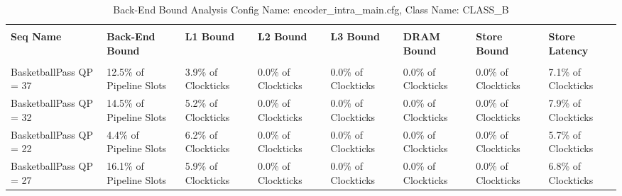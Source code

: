 \documentclass{article}%
\begin{document}
\begin{longtabu}{| X[l] | X[l] | X[l] | X[l] | X[l] | X[l] | X[l] | X[l] |}%
\caption{%
Back{-}End Bound Analysis\newline%
 Config Name: encoder\_intra\_main.cfg,\newline%
 Class Name: CLASS\_B\newline%
%
}%
\hline%
&&&&&&&\\%
\textbf{Seq Name}&\textbf{Back{-}End Bound}&\textbf{L1 Bound}&\textbf{L2 Bound}&\textbf{L3 Bound}&\textbf{DRAM Bound}&\textbf{Store Bound}&\textbf{Store Latency}\\%
&&&&&&&\\%
\hline%
\endhead%
BasketballPass\newline%
 QP = 37&12.5\% of Pipeline Slots&3.9\% of Clockticks&0.0\% of Clockticks&0.0\% of Clockticks&0.0\% of Clockticks&0.0\% of Clockticks&7.1\% of Clockticks\\%
\hline%
BasketballPass\newline%
 QP = 32&14.5\% of Pipeline Slots&5.2\% of Clockticks&0.0\% of Clockticks&0.0\% of Clockticks&0.0\% of Clockticks&0.0\% of Clockticks&7.9\% of Clockticks\\%
\hline%
BasketballPass\newline%
 QP = 22&4.4\% of Pipeline Slots&6.2\% of Clockticks&0.0\% of Clockticks&0.0\% of Clockticks&0.0\% of Clockticks&0.0\% of Clockticks&5.7\% of Clockticks\\%
\hline%
BasketballPass\newline%
 QP = 27&16.1\% of Pipeline Slots&5.9\% of Clockticks&0.0\% of Clockticks&0.0\% of Clockticks&0.0\% of Clockticks&0.0\% of Clockticks&6.8\% of Clockticks\\%
\hline%
\end{longtabu}%
\newpage

%
\end{document}

